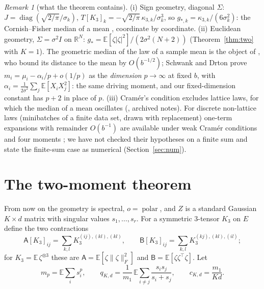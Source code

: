 \documentclass[10pt]{article}
\theoremstyle{definition}
\theoremstyle{remark}
\newtheorem{remark}[theorem]{Remark}
\newcommand{\R}{\mathbb{R}}
\newcommand{\E}{\mathbb{E}}
\newcommand{\nF}[1]{\|#1\|_{F}}
\newcommand{\polar}{\operatorname{polar}}
\newcommand{\cA}{\mathsf{A}}
\newcommand{\cB}{\mathsf{B}}
\begin{document}
\begin{remark}[what the theorem contains]\label{rem:cf}
(i) Sign geometry, diagonal $\Sigma$: $J=\operatorname{diag}(\sqrt{2/\pi}/\sigma_k)$,
$T[K_3]_k=-\sqrt{2/\pi}\,\kappa_{3,k}/\sigma_k^3$, so $g_{\ast,k}=\kappa_{3,k}/(6\sigma_k^2)$: the Cornish--Fisher median of a
mean \cite{cornish}, coordinate by coordinate. (ii) Euclidean geometry, $\Sigma=\sigma^2I$ on $\R^N$:
$g_\ast=\E[\zeta|\zeta|^2]/(2\sigma^2(N+2))$ (Theorem~\ref{thm:two} with $K=1$). The geometric median of the law of a
sample mean is the object of \cite{minsker}, who bound its distance to the mean by $O(b^{-1/2})$; Schwank and Drton
\cite{schwank} prove $m_i=\mu_i-\alpha_i/p+o(1/p)$ as the \emph{dimension} $p\to\infty$ at fixed $b$, with
$\alpha_i=\frac1{2\bar\sigma^2}\sum_j\E[X_iX_j^2]$: the same driving moment, and our fixed-dimension constant has $p+2$ in
place of $p$. (iii) Cram\'er's condition excludes lattice laws, for which the median of a mean oscillates
(\cite{manuscript}, archived notes). For discrete non-lattice laws (minibatches of a finite data set, drawn with
replacement) one-term expansions with remainder $O(b^{-1})$ are available under weak Cram\'er conditions and four
moments \cite{angstpoly,song}; we have not checked their hypotheses on a finite sum and state the finite-sum case as
numerical (Section~\ref{sec:num}).
\end{remark}

\section{The two-moment theorem}\label{sec:two}

From now on the geometry is spectral, $o=\polar$, and $Z$ is a standard Gaussian $K\times d$ matrix with singular values
$s_1,\dots,s_r$. For a symmetric $3$-tensor $K_3$ on $E$ define the two contractions
\[
\cA[K_3]_{ij}=\sum_{k,l}K_3^{(ij),(kl),(kl)},\qquad \cB[K_3]_{ij}=\sum_{k,l}K_3^{(kj),(kl),(il)};
\]
for $K_3=\E\,\zeta^{\otimes3}$ these are $\cA=\E[\zeta\nF\zeta^2]$ and $\cB=\E[\zeta\zeta^\top\zeta]$. Let
\begin{equation}\label{eq:q}
m_p=\E\sum_is_i^p,\qquad q_{K,d}=\frac1{m_1}\,\E\sum_{i\ne j}\frac{s_is_j}{s_i+s_j},\qquad c_{K,d}=\frac{m_1}{Kd}.
\end{equation}
\end{document}
